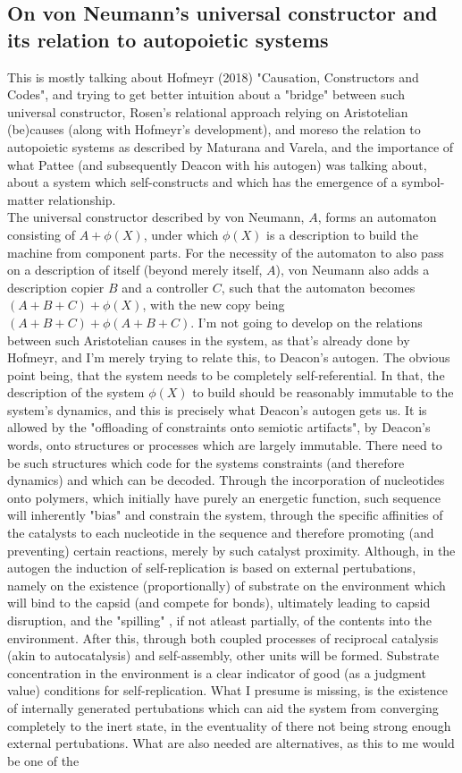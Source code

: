 \documentclass[a4paper,12pt,twoside,leqno]{article}
\begin{document}
\subsection*{On von Neumann's universal constructor and its relation to autopoietic systems}
This is mostly talking about Hofmeyr (2018) "Causation, Constructors and Codes", and trying to get better intuition about a "bridge" between such universal constructor, Rosen's relational approach relying on Aristotelian (be)causes (along with Hofmeyr's development), and moreso the relation to autopoietic systems as described by Maturana and Varela, and the importance of what Pattee (and subsequently Deacon with his autogen) was talking about, about a system which self-constructs and which has the emergence of a symbol-matter relationship.\\
The universal constructor described by von Neumann, $A$, forms an automaton consisting of $A + \phi(X)$, under which $\phi(X)$ is a description to build the machine from component parts. For the necessity of the automaton to also pass on a description of itself (beyond merely itself, $A$), von Neumann also adds a description copier $B$ and a controller $C$, such that the automaton becomes $(A + B + C) + \phi(X)$, with the new copy being $(A + B + C) + \phi(A + B + C)$. I'm not going to develop on the relations between such Aristotelian causes in the system, as that's already done by Hofmeyr, and I'm merely trying to relate this, to Deacon's autogen. The obvious point being, that the system needs to be completely self-referential. In that, the description of the system $\phi(X)$ to build should be reasonably immutable to the system's dynamics, and this is precisely what Deacon's autogen gets us. It is allowed by the "offloading of constraints onto semiotic artifacts", by Deacon's words, onto structures or processes which are largely immutable. There need to be such structures which code for the systems constraints (and therefore dynamics) and which can be decoded. Through the incorporation of nucleotides onto polymers, which initially have purely an energetic function, such sequence will inherently "bias" and constrain the system, through the specific affinities of the catalysts to each nucleotide in the sequence and therefore promoting (and preventing) certain reactions, merely by such catalyst proximity. Although, in the autogen the induction of self-replication is based on external pertubations, namely on the existence (proportionally) of substrate on the environment which will bind to the capsid (and compete for bonds), ultimately leading to capsid disruption, and the "spilling" , if not atleast partially, of the contents into the environment. After this, through both coupled processes of reciprocal catalysis (akin to autocatalysis) and self-assembly, other units will be formed. Substrate concentration in the environment is a clear indicator of good (as a judgment value) conditions for self-replication. What I presume is missing, is the existence of internally generated pertubations which can aid the system from converging completely to the inert state, in the eventuality of there not being strong enough external pertubations. What are also needed are alternatives, as this to me would be one of the 
\end{document}
